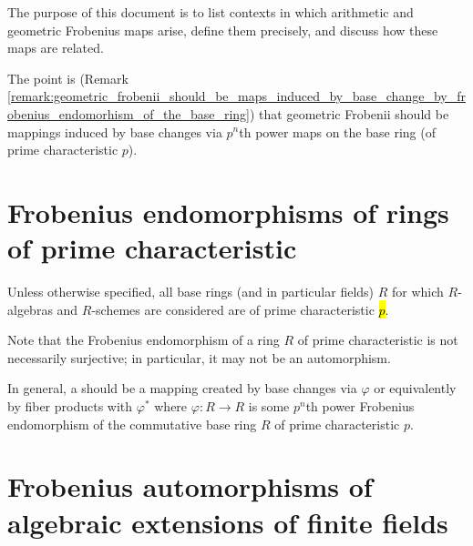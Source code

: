 The purpose of this document is to list contexts in which arithmetic and geometric Frobenius maps arise, define them precisely, and discuss how these maps are related.

The point is (Remark \ref{remark:geometric_frobenii_should_be_maps_induced_by_base_change_by_frobenius_endomorhism_of_the_base_ring}) that geometric Frobenii should be mappings induced by base changes via $p^n$th power maps on the base ring (of prime characteristic $p$).

\section{Frobenius endomorphisms of rings of prime characteristic}


\begin{convention} \label{convention:characteristic_of_base_ring}
Unless otherwise specified, all base rings (and in particular fields) $R$ for which $R$-algebras and $R$-schemes are considered are of prime characteristic \hl{$p$}.
\end{convention}




\begin{remark}
    Note that the Frobenius endomorphism of a ring $R$ of prime characteristic is not necessarily surjective; in particular, it may not be an automorphism.
\end{remark}

\begin{remark} \label{remark:geometric_frobenii_should_be_maps_induced_by_base_change_by_frobenius_endomorhism_of_the_base_ring}
    In general, a  should be a mapping created by base changes via $\varphi$ or equivalently by fiber products with $\varphi^*$ where $\varphi: R \to R$ is some $p^n$th power Frobenius endomorphism of the commutative base ring $R$ of prime characteristic $p$. 
\end{remark}


\section{Frobenius automorphisms of algebraic extensions of finite fields}

